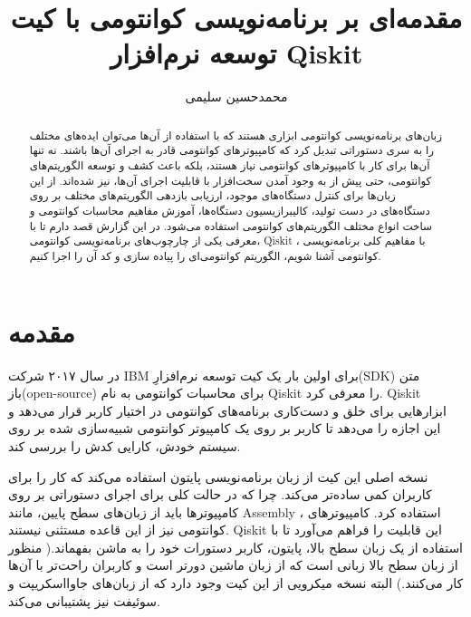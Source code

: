 \documentclass[a4paper,11pt,oneside,openany]{iut-thesis}
\begin{document}
	

\subject{
	مکانیک کوانتومی ۲
}
\field{
}
\title{
مقدمه‌ای بر برنامه‌نویسی کوانتومی با کیت توسعه نرم‌افزار  Qiskit
}
\tit{}
\secsupervisor{
}
\advisor{
}
\secadvisor{} 
\author{
	محمدحسین سلیمی}

\makefatitle


\begin{abstract}
زبان‌های برنامه‌نویسی کوانتومی ابزاری هستند که با استفاده از آن‌ها می‌توان ایده‌های مختلف را به سری دستوراتی تبدیل کرد که کامپیوترهای کوانتومی قادر به اجرای آن‌ها باشند. نه تنها آن‌ها برای کار با کامپیوترهای کوانتومی نیاز هستند، بلکه باعث کشف و توسعه الگوریتم‌های کوانتومی، حتی پیش از به وجود آمدن سخت‌افزار با قابلیت اجرای آن‌ها، نیز شده‌اند. از این زبان‌ها برای کنترل دستگاه‌های موجود، ارزیابی بازدهی الگوریتم‌های مختلف بر روی دستگاه‌های در دست تولید،‌ کالیبرازیسیون دستگاه‌ها، آموزش مفاهیم محاسبات کوانتومی و ساخت انواع مختلف الگوریتم‌های کوانتومی استفاده می‌شود. 
در این گزارش قصد دارم تا با معرفی یکی از چارچوب‌های برنامه‌نویسی کوانتومی، Qiskit ، با مفاهیم کلی برنامه‌نویسی کوانتومی آشنا شویم، الگوریتم کوانتومی‌ای را پیاده سازی و کد آن را اجرا کنیم.
\end{abstract}
\newpage

\tableofcontents

\newpage


\section{
مقدمه
}
در سال ۲۰۱۷ شرکت IBM برای اولین بار یک کیت توسعه نرم‌افزارِ(SDK) متن باز(open-source) برای محاسبات کوانتومی به نام Qiskit را معرفی کرد. Qiskit ابزارهایی برای خلق و دست‌کاری برنامه‌های کوانتومی در اختیار کاربر قرار می‌دهد و این اجازه را می‌دهد تا کاربر بر روی یک کامپیوتر کوانتومی شبیه‌سازی شده بر روی سیستم خودش، کارایی کدش را بررسی کند.

 نسخه اصلی این کیت از زبان برنامه‌نویسی پایتون استفاده می‌کند که کار را برای کاربران کمی ساده‌‌تر می‌کند. چرا که در حالت کلی برای اجرای دستوراتی بر روی کامپیوترها باید از زبان‌های سطح پایین، مانند Assembly ، استفاده کرد. کامپیوترهای کوانتومی نیز از این قاعده مستثنی نیستند. Qiskit این قابلیت را فراهم می‌آورد تا با استفاده از یک زبان سطح بالا، پایتون، کاربر دستورات خود را به ماشن بفهماند.( منظور    از زبان سطح بالا زبانی است که از زبان ماشین دورتر است و کاربران راحت‌تر با آن‌ها کار می‌کنند.) البته نسخه میکرویی از این کیت وجود دارد که از زبان‌های جاوااسکریپت و سوئیفت نیز پشتیبانی می‌کند.
\end{document}
